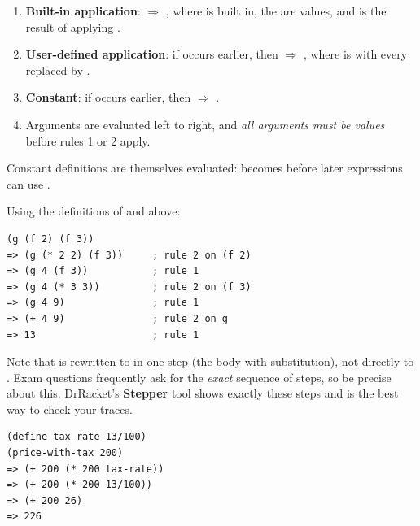 \begin{important}
\begin{enumerate}
  \item \textbf{Built-in application}:  $\Rightarrow$ , where  is built in, the  are values, and  is the result of applying .
  \item \textbf{User-defined application}: if  occurs earlier, then  $\Rightarrow$ , where  is  with every  replaced by .
  \item \textbf{Constant}: if  occurs earlier, then  $\Rightarrow$ .
  \item Arguments are evaluated left to right, and \emph{all arguments must be values} before rules 1 or 2 apply.
\end{enumerate}
\end{important}

Constant definitions are themselves evaluated: 
becomes  before later expressions can use .

\begin{example}
Using the definitions of  and  above:
\begin{lstlisting}[style=racket]
(g (f 2) (f 3))
=> (g (* 2 2) (f 3))     ; rule 2 on (f 2)
=> (g 4 (f 3))           ; rule 1
=> (g 4 (* 3 3))         ; rule 2 on (f 3)
=> (g 4 9)               ; rule 1
=> (+ 4 9)               ; rule 2 on g
=> 13                    ; rule 1
\end{lstlisting}
\end{example}

Note that  is rewritten to  in one step (the body
with substitution), not directly to . Exam questions frequently ask for
the \emph{exact} sequence of steps, so be precise about this. DrRacket's
\textbf{Stepper} tool shows exactly these steps and is the best way to check
your traces.

\begin{example}
\begin{lstlisting}[style=racket]
(define tax-rate 13/100)
(price-with-tax 200)
=> (+ 200 (* 200 tax-rate))
=> (+ 200 (* 200 13/100))
=> (+ 200 26)
=> 226
\end{lstlisting}
\end{example}

